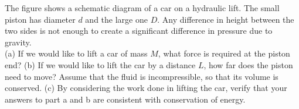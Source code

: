 The figure shows a schematic diagram of a car on a hydraulic lift.
The small piston has diameter $d$ and the large one $D$.
Any difference in height between the two sides is not enough to
create a significant difference in pressure due to gravity.\\
%
(a) If we would like to lift a car of mass $M$, what force is
required at the piston end?\answercheck\hwendpart
%
(b) If we would like to lift the car by a distance $L$, how far does
the piston need to move? Assume that the fluid is incompressible, so that its
volume is conserved.\answercheck\hwendpart
%
(c) By considering the work done in lifting the car,
verify that your answers to part a and b are consistent with conservation
of energy.
